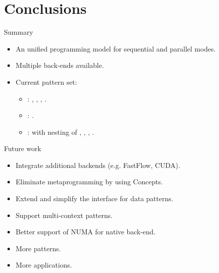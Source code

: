 \section{Conclusions}

\begin{frame}[t]{Summary}
\begin{itemize}
  \item An unified programming model for sequential and parallel modes.
  \item Multiple back-ends available.
  \item Current pattern set:
    \begin{itemize}
      \item {}: , , , .
      \item {}: .
      \item {}:  with nesting of , ,
            , .
    \end{itemize}
\end{itemize}
\end{frame}

\begin{frame}[t]{Future work}
\begin{itemize}
  \item Integrate additional backends (e.g. FastFlow, CUDA).
  \item Eliminate metaprogramming by using Concepts.
  \item Extend and simplify the interface for data patterns.
  \item Support multi-context patterns.
  \item Better support of NUMA for native back-end. 
  \item More patterns.
  \item More applications.
\end{itemize}
\end{frame}

